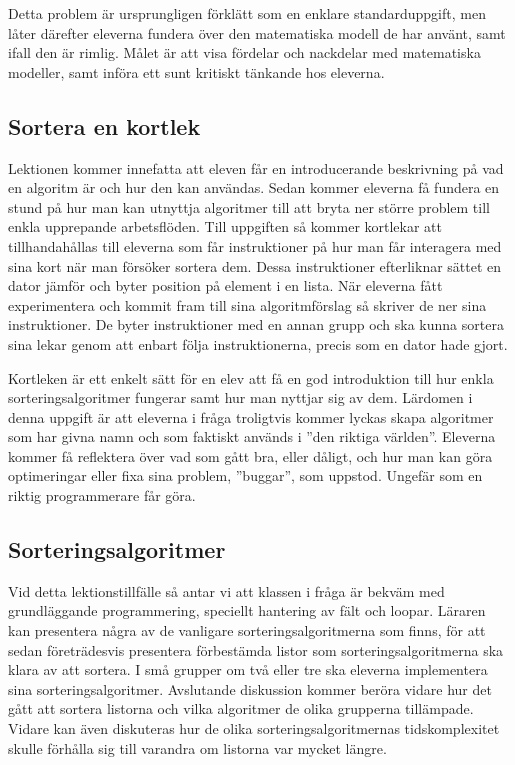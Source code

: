     \textcolor{lila}{Detta problem är ursprungligen förklätt som en enklare standarduppgift, men låter därefter eleverna fundera över den matematiska modell de har använt, samt ifall den är rimlig. Målet är att visa fördelar och nackdelar med matematiska modeller, samt införa ett sunt kritiskt tänkande hos eleverna.}
    
\subsection{Sortera en kortlek}
    \label{sec:Sortera}
    
    \textcolor{WildStrawberry}{
        Lektionen kommer innefatta att eleven får en introducerande beskrivning på vad en algoritm är och hur den kan användas. Sedan kommer eleverna få fundera en stund på hur man kan utnyttja algoritmer till att bryta ner större problem till enkla upprepande arbetsflöden. Till uppgiften så kommer kortlekar att tillhandahållas till eleverna som får instruktioner på hur man får interagera med sina kort när man försöker sortera dem. Dessa instruktioner efterliknar sättet en dator jämför och byter position på element i en lista. När eleverna fått experimentera och kommit fram till sina algoritmförslag så skriver de ner sina instruktioner. De byter instruktioner med en annan grupp och ska kunna sortera sina lekar genom att enbart följa instruktionerna, precis som en dator hade gjort.}
        
    \textcolor{WildStrawberry}{
        Kortleken är ett enkelt sätt för en elev att få en god introduktion till hur enkla sorteringsalgoritmer fungerar samt hur man nyttjar sig av dem. Lärdomen i denna uppgift är att eleverna i fråga troligtvis kommer lyckas skapa algoritmer som har givna namn och som faktiskt används i ''den riktiga världen''. Eleverna kommer få reflektera över vad som gått bra, eller dåligt, och hur man kan göra optimeringar eller fixa sina problem, ''buggar'', som uppstod. Ungefär som en riktig programmerare får göra. }
        
\subsection{Sorteringsalgoritmer}
    \label{sec:sorteringsalgoritmer}
    
    \textcolor{WildStrawberry}{
        Vid detta lektionstillfälle så antar vi att klassen i fråga är bekväm med grundläggande programmering, speciellt hantering av fält och loopar. Läraren kan presentera några av de vanligare sorteringsalgoritmerna som finns, för att sedan företrädesvis presentera förbestämda listor som sorteringsalgoritmerna ska klara av att sortera. I små grupper om två eller tre ska eleverna implementera sina sorteringsalgoritmer. Avslutande diskussion kommer beröra vidare hur det gått att sortera listorna och vilka algoritmer de olika grupperna tillämpade. Vidare kan även diskuteras hur de olika sorteringsalgoritmernas tidskomplexitet skulle förhålla sig till varandra om listorna var mycket längre.}
        
